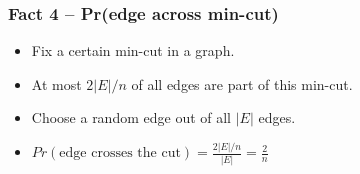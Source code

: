 \begin{frame}
  \frametitle{Fact 4 -- Pr(edge across min-cut)}

  \begin{itemize}
    \item Fix a certain min-cut in a graph.
    \item At most $2|E|/n$ of all edges are part of this min-cut.
    \item Choose a random edge out of all $|E|$ edges.
    \item $Pr(\text{edge crosses the cut}) = \frac{2|E|/n}{|E|} = \frac{2}{n}$
  \end{itemize}

\end{frame}
